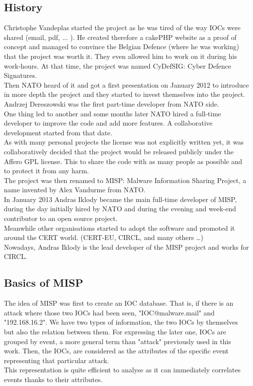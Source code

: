 \documentclass{eplmastersthesis}
\begin{document}
\subsection{History}
Christophe Vandeplas started the project as he was tired of the way IOCs were shared (email, pdf, ... ). He created therefore a cakePHP website as a proof of concept and managed to convince the Belgian Defence (where he was working) that the project was worth it. They even allowed him to work on it during his work-hours. At that time, the project was named CyDefSIG: Cyber Defence Signatures.\\

Then NATO heard of it and got a first presentation on January 2012 to introduce in more depth the project and they started to invest themselves into the project. Andrzej Dereszowski was the first part-time developer from NATO side.\\
One thing led to another and some months later NATO hired a full-time developer to improve the code and add more features. A collaborative development started from that date. \\
As with many personal projects the license was not explicitly written yet, it was collaboratively decided that the project would be released publicly under the Affero GPL license. This to share the code with as many people as possible and to protect it from any harm.\\
The project was then renamed to MISP: Malware Information Sharing Project, a name invented by Alex Vandurme from NATO.\\
In January 2013 Andras Iklody became the main full-time developer of MISP, during the day initially hired by NATO and during the evening and week-end contributor to an open source project.\\

Meanwhile other organisations started to adopt the software and promoted it around the CERT world. (CERT-EU, CIRCL, and many others …)\\
Nowadays, Andras Iklody is the lead developer of the MISP project and works for CIRCL.\\

\subsection{Basics of MISP}
The idea of MISP was first to create an IOC database. That is, if there is an attack where those two IOCs had been seen, "IOC@malware.mail" and "192.168.16.2". We have two types of information, the two IOCs by themselves but also the relation between them. For expressing the later one, IOCs are grouped by event, a more general term than "attack" previously used in this work.  Then, the IOCs, are considered as the attributes of the specific event representing that particular attack.\\
This representation is quite efficient to analyse as it can immediately correlates events thanks to their attributes.\\
\end{document}
